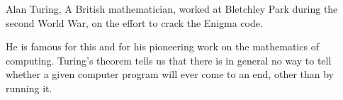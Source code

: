 Alan Turing, A British mathematician, worked at Bletchley Park during
the second World War, on the effort to crack the Enigma code.
\par
He is famous for this and for his pioneering work on the mathematics
of computing. Turing's theorem tells us that there is in general no way 
to tell whether a given computer program will ever come to an end, other 
than by running it.
